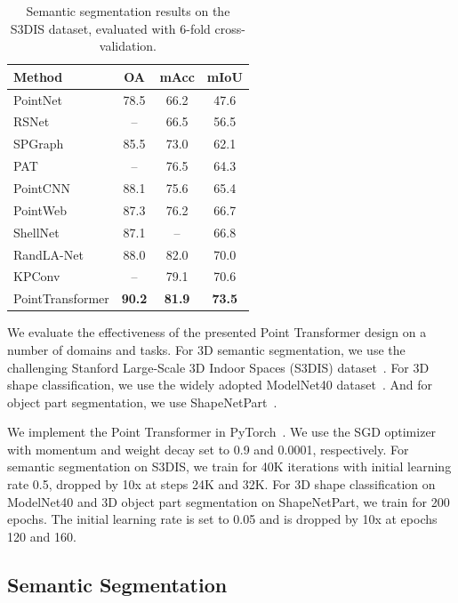\begin{table}[!th]
	\centering
		\begin{tabular}{ l | c c c}
			\toprule[1pt]
			Method & OA & mAcc & mIoU \\
			\hline
			PointNet~\cite{qi2017pointnet} & 78.5 & 66.2 & 47.6 \\
			RSNet~\cite{huang2018recurrent} & -- & 66.5 & 56.5 \\
			SPGraph~\cite{landrieu2018spg} & 85.5 & 73.0 & 62.1 \\
			PAT~\cite{yang2019modeling} & -- & 76.5 & 64.3 \\
			PointCNN~\cite{li2018pointcnn} & 88.1 & 75.6 & 65.4 \\
			PointWeb~\cite{zhao2019pointweb} & 87.3 & 76.2 & 66.7 \\
			ShellNet~\cite{zhang2019shellnet} & 87.1 & -- & 66.8 \\
			RandLA-Net~\cite{thomas2019kpconv} & 88.0 & 82.0 & 70.0 \\
			KPConv~\cite{thomas2019kpconv} & -- & 79.1 & 70.6 \\
			\hline
			PointTransformer & \textbf{90.2} & \textbf{81.9} & \textbf{73.5} \\
			\bottomrule[1pt]
	\end{tabular}
	\caption{Semantic segmentation results on the S3DIS dataset, evaluated with 6-fold cross-validation.}
	\label{tab:s3disresult2}
\end{table}

We evaluate the effectiveness of the presented Point Transformer design on a number of domains and tasks. For 3D semantic segmentation, we use the challenging Stanford Large-Scale 3D Indoor Spaces (S3DIS) dataset~\cite{armeni2016s3dis}. For 3D shape classification, we use the widely adopted ModelNet40 dataset~\cite{wu2015modelnet}. And for object part segmentation, we use ShapeNetPart~\cite{yi2016scalable}.

We implement the Point Transformer in PyTorch~\cite{Paszke2019Pytorch}. We use the SGD optimizer with momentum and weight decay set to 0.9 and 0.0001, respectively. For semantic segmentation on S3DIS, we train for 40K iterations with initial learning rate 0.5, dropped by 10x at steps 24K and 32K. For 3D shape classification on ModelNet40 and 3D object part segmentation on ShapeNetPart, we train for 200 epochs. The initial learning rate is set to 0.05 and is dropped by 10x at epochs 120 and 160.

\subsection{Semantic Segmentation}

